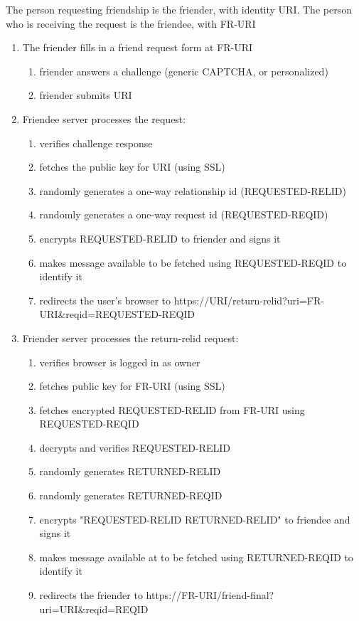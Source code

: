 \documentclass[letterpaper,11pt,oneside]{article}
\begin{document}
The person requesting friendship is the friender, with identity URI. The person
who is receiving the request is the friendee, with FR-URI

\begin{enumerate}
\item The friender fills in a friend request form at FR-URI
	\begin{enumerate}
	\item friender answers a challenge (generic CAPTCHA, or personalized)
	\item friender submits URI
	\end{enumerate}

\item Friendee server processes the request:
	\begin{enumerate}
	\item verifies challenge response
	\item fetches the public key for URI (using SSL)
	\item randomly generates a one-way relationship id (REQUESTED-RELID)
	\item randomly generates a one-way request id (REQUESTED-REQID)
	\item encrypts REQUESTED-RELID to friender and signs it
	\item makes message available to be fetched using REQUESTED-REQID to identify it
	\item redirects the user's browser to https://URI/return-relid?uri=FR-URI\&reqid=REQUESTED-REQID
	\end{enumerate}

\item Friender server processes the return-relid request:
	\begin{enumerate}
	\item verifies browser is logged in as owner
	\item fetches public key for FR-URI (using SSL)
	\item fetches encrypted REQUESTED-RELID from FR-URI using REQUESTED-REQID
	\item decrypts and verifies REQUESTED-RELID
	\item randomly generates RETURNED-RELID
	\item randomly generates RETURNED-REQID
	\item encrypts "REQUESTED-RELID RETURNED-RELID" to friendee and signs it
	\item makes message available at to be fetched using RETURNED-REQID to identify it
	\item redirects the friender to https://FR-URI/friend-final?uri=URI\&reqid=REQID
	\end{enumerate}


\end{enumerate}
\end{document}
